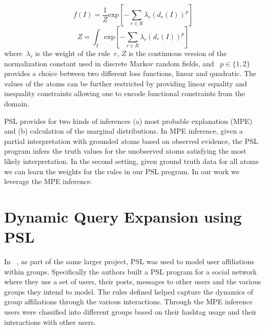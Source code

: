 \begin{equation}
\label{eq:contimn1}
    f (I) = \frac{1}{Z} \text{exp}[-\sum_{r\in R} \lambda_r (d_r(I))^p]
\end{equation}
\begin{equation}
\label{eq:contimn2}
	Z = \int_{I} \text{exp} [ -\sum_{r\in R} \lambda_r (d_r(I))^p ]
\end{equation}
where~$\lambda_r$ is the weight of the rule~$r$, $Z$ is the continuous version of the normalization constant used in discrete Markov random fields, and ~$p \in \{1, 2\}$ provides a choice between two different loss functions, linear and quadratic.
The values of the atoms can be further restricted by providing linear equality and inequality constraints allowing one to encode functional constraints from the domain.

PSL provides for two kinds of inferences (a) most probable explanation (MPE) 
and (b) calculation of the marginal distributions. 
In MPE inference, given a partial interpretation with grounded atoms based on observed evidence, the PSL program infers the truth values for the unobserved atoms satisfying the most likely interpretation. 
In the second setting, given ground truth data for all atoms we can learn the weights for the rules in our PSL program.
In our work we leverage the MPE inference.

\section{Dynamic Query Expansion using PSL}
In ~\cite{huang2012social}, as part of the same larger project,
PSL was used
to model user affiliations within groups. 
Specifically the authors built a PSL program
for a  social network where they use a set of users, their posts, messages to other users and the various groups they intend to model. 
The rules defined helped capture the dynamics of group affiliations through the various interactions.
Through the MPE inference users were classified into different groups based on their hashtag usage and their interactions with other users.

